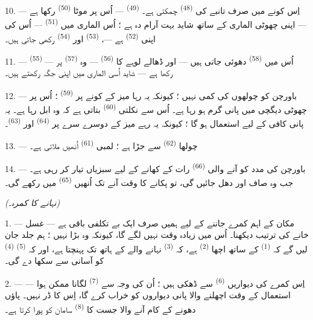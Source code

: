 10. --- اِس کونے میں صرف تانبے کی 
\textsuperscript{(48)} چمکتی ہے۔ 
\textsuperscript{(49)} — اُس پر موٹا 
\textsuperscript{(50)} رکھا ہے — اپنی چھوٹی الماری کے ساتھ شاید بہت
آرام دہ ہے ؛ اُس الماری میں 
\textsuperscript{(51)} — اُس کی اپنی 
\textsuperscript{(52)} ہے —، 
\textsuperscript{(53)} اور  \textsuperscript{(54)}
رکھی جاتی ہیں۔

\VUsaut{4.0mm}
\VUsaut{3.0mm}

11. ---  \textsuperscript{(55)} — اُس میں
 \textsuperscript{(58)} دھوئی جاتی ہیں — اور ڈھالے
لوہے کا  \textsuperscript{(56)} — وہ  \textsuperscript{(57)} پر رکھا ہے — شاید اُسی الماری میں اپنی
جگہ رکھتے ہیں۔

12. --- باورچن کو چولھوں کی کمی نہیں ؛ کیونکہ یہ رہا میز کے کونے پر
 \textsuperscript{(59)} ؛ اُس پر چھوٹی دیگچی میں
پانی گرم ہو رہا ہے۔ اُس سے نکلتی  \textsuperscript{(60)}
بتاتی ہے کہ وہ ابل رہا ہے۔ یہ پانی کافی کے لیے استعمال ہو گا ؛
کیونکہ یہ رہے میز کے دوسرے سرے پر 
\textsuperscript{(64)} اور 
\textsuperscript{(63)}۔

13. --- چولھا  \textsuperscript{(62)} سے
جڑا ہے ؛ لمبی  \textsuperscript{(61)} اُنھیں
ملاتی ہے۔

14. --- باورچن کی مدد کو آنے والی 
\textsuperscript{(66)} رات کے کھانے کے لیے سبزیاں تیار کر رہی ہے۔ جب
وہ صاف اور دھل جائیں گی، تو پکانے کا وقت آنے تک اُنھیں  \textsuperscript{(65)} میں رکھے گی۔

\VUsaut{4.0mm}
{\centering\fontsize{10.2pt}{10.2pt}\selectfont{} \textit{(نہانے کا کمرہ۔)}\par}
\VUsaut{3.0mm}

1. --- مکان کے اہم کمرے جاننے کے لیے ہمیں صرف ایک بے تکلفی باقی ہے —
غسل خانے کی ترتیب دیکھنا۔ اُس میں زیادہ وقت نہیں لگے گا، کیونکہ وہ
بڑا نہیں ؛ ہم جلد جان لیں گے کہ 
\textsuperscript{(1)} کے ساتھ اچھا 
\textsuperscript{(2)} ہے، کہ  \textsuperscript{(3)}
نہانے والے کے ہاتھ تک پہنچتا ہے، اور کہ  \textsuperscript{(5)}  \textsuperscript{(4)} کو
آسانی سے سکھا دے گی۔

2. --- اِس کمرے کی دیواریں 
\textsuperscript{(6)} سے ڈھکی ہیں ؛ اُن کی وجہ سے  \textsuperscript{(7)} لگانا ممکن ہوا — استعمال کے وقت اچھلنے
والا پانی دیواروں کو خراب کرے گا، اِس کا ڈر نہیں۔ پاؤں دھونے کے کام
آنے والا جست کا  \textsuperscript{(8)} سامان کو
پورا کرتا ہے۔

\VUsaut{6.0mm}
\VUfilet{22mm}
